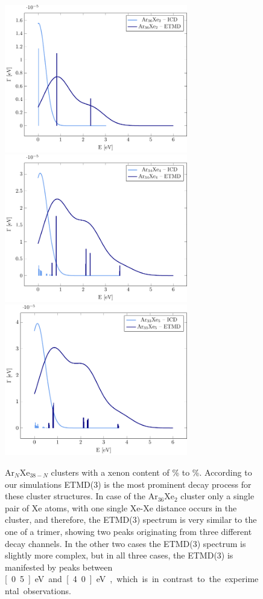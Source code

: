 \begin{figure}
 \centering
 \includegraphics[width=8.0cm]{pics/Ar36Xe2.pdf}
 \includegraphics[width=8.0cm]{pics/Ar34Xe4.pdf}
 \includegraphics[width=8.0cm]{pics/Ar33Xe5.pdf}
 \caption{Ar$_N$Xe$_{38-N}$ clusters with a xenon content of
          \unit[5]{\%} to \unit[13]{\%}.
          According to our simulations ETMD(3) is the most prominent decay
          process for these cluster structures.
          In case of the Ar$_{36}$Xe$_2$ cluster only a single pair of Xe
          atoms, with one single Xe-Xe distance occurs in the cluster,
          and therefore, the ETMD(3) spectrum is very similar
          to the one of a trimer, showing two peaks originating
          from three different decay channels. In the other two cases the ETMD(3)
          spectrum is slightly more complex, but in all three cases, the ETMD(3)
          is manifested by peaks between \unit[0.5]{eV} and \unit[4.0]{eV}, which 
          is in contrast to the experimental observations.}
 \label{figure:ArXe_lt15}
\end{figure}

